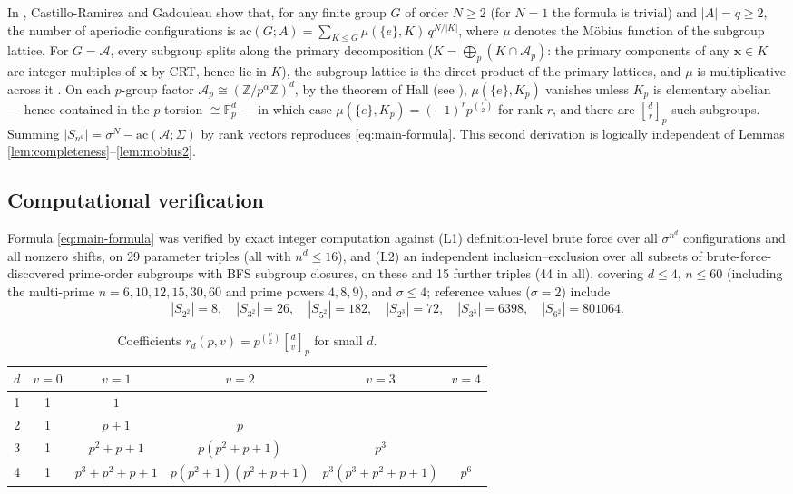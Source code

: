 \documentclass[11pt,a4paper]{article}
\theoremstyle{remark}
\newcommand{\ZZ}{\mathbb{Z}}
\newcommand{\FF}{\mathbb{F}}
\newcommand{\A}{\mathcal{A}}
\newcommand{\gaussbinom}[2]{\genfrac{[}{]}{0pt}{}{#1}{#2}}
\begin{document}
In \cite[Lemma~7(i)]{cg2017}, Castillo-Ramirez and Gadouleau show that, for any
finite group $G$ of order $N\ge2$ (for $N=1$ the formula is trivial) and $|A|=q\ge2$, the number of aperiodic
configurations is
$\mathrm{ac}(G;A)=\sum_{K\le G}\mu(\{e\},K)\,q^{N/|K|}$, where $\mu$ denotes the
M\"obius function of the subgroup lattice. For $G=\A$, every subgroup
splits along the primary decomposition ($K=\bigoplus_p(K\cap\A_p)$: the
primary components of any $\mathbf x\in K$ are integer multiples of
$\mathbf x$ by CRT, hence lie in $K$), the subgroup lattice is the direct
product of the primary lattices, and $\mu$ is multiplicative across it
\cite[Prop.~3.8.2]{stanley2012}. On each $p$-group factor
$\A_p\cong(\ZZ/p^{\alpha}\ZZ)^d$, by the theorem of Hall
\cite{hall1933} (see \cite[Cor.~3.5]{hio1989}), $\mu(\{e\},K_p)$ vanishes
unless $K_p$ is elementary abelian --- hence contained in the $p$-torsion
$\cong\FF_p^d$ --- in which case
$\mu(\{e\},K_p)=(-1)^{r}p^{\binom r2}$ for rank $r$, and there are
$\gaussbinom dr_p$ such subgroups. Summing
$|S_{n^d}|=\sigma^N-\mathrm{ac}(\A;\Sigma)$ by rank vectors reproduces
\eqref{eq:main-formula}. This second derivation is logically independent
of Lemmas \ref{lem:completeness}--\ref{lem:mobius2}.

\subsection{Computational verification}\label{sec:compver}

Formula \eqref{eq:main-formula} was verified by exact integer computation
against (L1) definition-level brute force over all $\sigma^{n^d}$
configurations and all nonzero shifts, on 29 parameter triples (all with
$n^d\le16$), and (L2) an independent
inclusion--exclusion over all subsets of brute-force-discovered prime-order
subgroups with BFS subgroup closures, on these and 15 further triples
(44 in all), covering
$d\le4$, $n\le60$ (including the multi-prime $n=6,10,12,15,30,60$ and
prime powers $4,8,9$), and $\sigma\le4$; reference values ($\sigma=2$) include
\[
|S_{2^2}|=8,\quad |S_{3^2}|=26,\quad |S_{5^2}|=182,\quad
|S_{2^3}|=72,\quad |S_{3^3}|=6398,\quad |S_{6^2}|=801064 .
\]

\begin{table}[ht]
\centering
\caption{Coefficients $r_d(p,v)=p^{\binom v2}\gaussbinom dv_p$ for small $d$.}\label{tab:coef}
\begin{tabular}{c|c|cccc}
\toprule
$d$ & $v=0$ & $v=1$ & $v=2$ & $v=3$ & $v=4$ \\
\midrule
1 & 1 & $1$ & & & \\
2 & 1 & $p+1$ & $p$ & & \\
3 & 1 & $p^2{+}p{+}1$ & $p(p^2{+}p{+}1)$ & $p^3$ & \\
4 & 1 & $p^3{+}p^2{+}p{+}1$ & $p(p^2{+}1)(p^2{+}p{+}1)$ &
$p^3(p^3{+}p^2{+}p{+}1)$ & $p^6$ \\
\bottomrule
\end{tabular}
\end{table}
\end{document}
